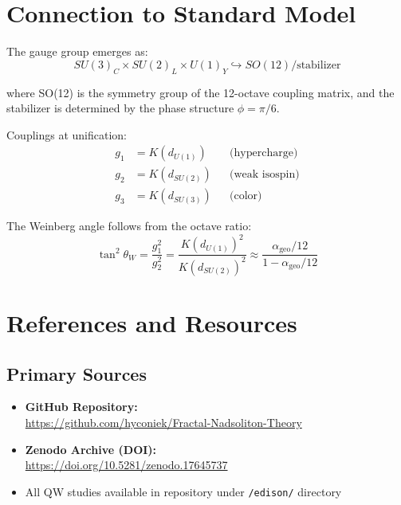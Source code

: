 \documentclass[11pt,a4paper]{book}
\theoremstyle{remark}
\newcommand{\alphageo}{\alpha_{\text{geo}}}
\begin{document}
\section{Connection to Standard Model}

The gauge group emerges as:
\begin{equation}
SU(3)_C \times SU(2)_L \times U(1)_Y \hookrightarrow SO(12) / \text{stabilizer}
\end{equation}

where SO(12) is the symmetry group of the 12-octave coupling matrix, and the stabilizer is determined by the phase structure $\phi = \pi/6$.

Couplings at unification:
\begin{align}
g_1 &= K(d_{U(1)}) &&\text{(hypercharge)} \\
g_2 &= K(d_{SU(2)}) &&\text{(weak isospin)} \\
g_3 &= K(d_{SU(3)}) &&\text{(color)}
\end{align}

The Weinberg angle follows from the octave ratio:
\begin{equation}
\tan^2\theta_W = \frac{g_1^2}{g_2^2} = \frac{K(d_{U(1)})^2}{K(d_{SU(2)})^2} \approx \frac{\alphageo/12}{1 - \alphageo/12}
\end{equation}

\section{References and Resources}

\subsection{Primary Sources}

\begin{itemize}
    \item \textbf{GitHub Repository:} \\
    \url{https://github.com/hyconiek/Fractal-Nadsoliton-Theory}
    
    \item \textbf{Zenodo Archive (DOI):} \\
    \url{https://doi.org/10.5281/zenodo.17645737}
    
    \item All QW studies available in repository under \texttt{/edison/} directory
\end{itemize}
\end{document}
